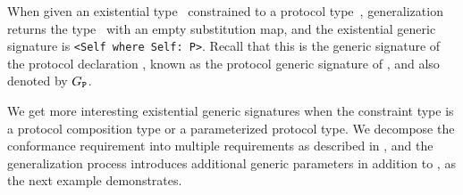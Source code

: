 \documentclass[../generics]{subfiles}
\begin{document}
\begin{example}
When given an existential type \AnyP\ constrained to a protocol type~\tP, generalization returns the type \tP\ with an empty substitution map, and the existential generic signature is \verb|<Self where Self: P>|. Recall that this is the generic signature of the protocol declaration \tP, known as the protocol generic signature of \tP, and also denoted by $G_{\texttt{P}}$.
\end{example}

We get more interesting existential generic signatures when the constraint type is a protocol composition type or a parameterized protocol type. We decompose the conformance requirement into multiple requirements as described in , and the generalization process introduces additional generic parameters in addition to \tSelf, as the next example demonstrates.
\end{document}
